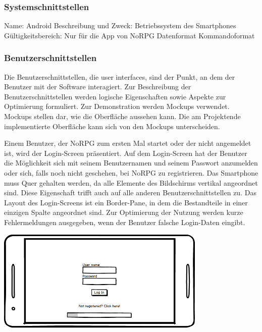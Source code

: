 	
		\subsubsection{Systemschnittstellen}
			Name: Android 
			Beschreibung und Zweck: Betriebssystem des Smartphones
			Gültigkeitsbereich: Nur für die App von NoRPG
			Datenformat
			Kommandoformat
		
		\subsubsection{Benutzerschnittstellen}
			Die Benutzerschnittstellen, die user interfaces, sind der Punkt, an dem der Benutzer mit der Software interagiert. Zur Beschreibung der Benutzerschnittstellen werden logische Eigenschaften sowie Aspekte zur Optimierung formuliert. Zur Demonstration werden Mockups verwendet. Mockups stellen dar, wie die Oberfläche aussehen kann. Die am Projektende implementierte Oberfläche kann sich von den Mockups unterscheiden.
			
			Einem Benutzer, der NoRPG zum ersten Mal startet oder der nicht angemeldet ist, wird der Login-Screen präsentiert. Auf dem Login-Screen hat der Benutzer die Möglichkeit sich mit seinem Benutzernamen und seinem Passwort anzumelden oder sich, falls noch nicht geschehen, bei NoRPG zu registrieren. Das Smartphone muss Quer gehalten werden, da alle Elemente des Bildschirms vertikal angeordnet sind. Diese Eigenschaft trifft auch auf alle anderen Benutzerschnittstellen zu. Das Layout des Login-Screens ist ein Border-Pane, in dem die Bestandteile in einer einzigen Spalte angeordnet sind. Zur Optimierung der Nutzung werden kurze Fehlermeldungen ausgegeben, wenn der Benutzer falsche Login-Daten eingibt.
			\begin{center}
				\includegraphics[width=10cm]{pics/Login.png}
			\end{center}
			
